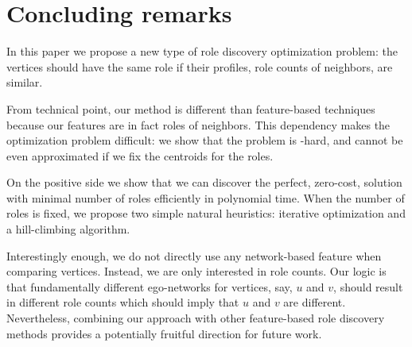 \section{Concluding remarks}
\label{sec:conclusions}

In this paper we propose a new type of role discovery optimization problem:
the vertices should have the same role if their profiles, role
counts of neighbors, are similar.

From technical point, our method is different than feature-based techniques
because our features are in fact roles of neighbors.
This dependency makes the optimization
problem difficult: we show that the problem is \np-hard, and cannot be even approximated if we fix the
centroids for the roles.

On the positive side we show that we can discover the perfect, zero-cost,
solution with minimal number of roles efficiently in polynomial time. When the
number of roles is fixed, we propose two simple natural heuristics: iterative
optimization and a hill-climbing algorithm.

Interestingly enough, we do not directly use any network-based feature when
comparing vertices. Instead, we are only interested in role counts. Our logic
is that fundamentally different ego-networks for vertices, say, $u$ and $v$,
should result in different role counts which should imply that $u$ and $v$ are
different. Nevertheless, combining our approach with other feature-based role
discovery methods provides a potentially fruitful direction for future work. 
